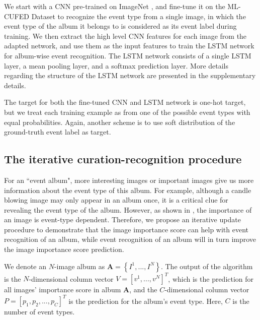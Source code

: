\documentclass[runningheads]{llncs}
\begin{document}
We start with a CNN pre-trained on ImageNet \cite{caffe} \cite{imagenet}, and fine-tune it on the ML-CUFED Dataset to recognize the event type from a single image,  in which the event type of the album it belongs to is considered as its event label during training. We then extract the high level CNN features for each image from the adapted network, and use them as the input features to train the LSTM network for album-wise event recognition. The LSTM network consists of a single LSTM layer, a mean pooling layer, and a softmax prediction layer. More details regarding the structure of the LSTM network are presented in the supplementary details.

The target for both the fine-tuned CNN and LSTM network is one-hot target, but we treat each training example as from one of the possible event types with equal probabilities. Again, another scheme is to use soft distribution of the ground-truth event label as target.
%
%
%





\subsection{The iterative curation-recognition procedure}
For an ``event album", more interesting images or important images give us more information about the event type of this album. For example, although a candle blowing image may only appear in an album once, it is a critical clue for revealing the event type of the album. However, as shown in \cite{CVPR}, the importance of an image is event-type dependent. Therefore, we propose an iterative update procedure to demonstrate that the image importance score can help with event recognition of an album, while event recognition of an album will in turn improve the image importance score prediction.

We denote an $N$-image album as $\mathbf{A}= \left \{I^{1}, ..., I^{N}  \right \}$. The output of the algorithm is the $N$-dimensional column vector $V = [v^{1}, ..., v^{N}]^{T}$, which is the prediction for all images' importance score in album $\mathbf{A}$, and the $C$-dimensional column vector $P = [p_{1}, p_{2},..., p_{C}]^{T}$ is the prediction for the album's event type. Here, $C$ is the number of event types. 
\end{document}
